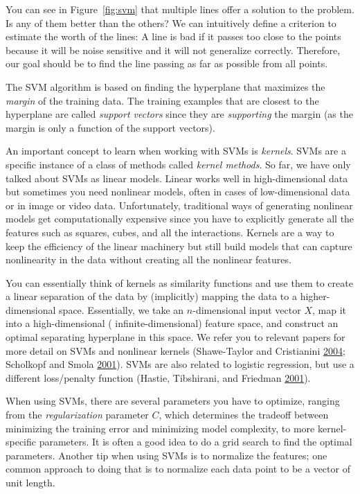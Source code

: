 \documentclass[]{krantz}
\begin{document}
You can see in Figure~\ref{fig:svm} that multiple lines offer a solution
to the problem. Is any of them better than the others? We can
intuitively define a criterion to estimate the worth of the lines: A
line is bad if it passes too close to the points because it will be
noise sensitive and it will not generalize correctly. Therefore, our
goal should be to find the line passing as far as possible from all
points.

The SVM algorithm is based on finding the hyperplane that maximizes the
\emph{margin} of the training data. The training examples that are
closest to the hyperplane are called \emph{support vectors} since they
are \emph{supporting} the margin (as the margin is only a function of
the support vectors).

An important concept to learn when working with SVMs is \emph{kernels}.
SVMs are a specific instance of a class of methods called \emph{kernel
methods}. So far, we have only talked about SVMs as linear models.
Linear works well in high-dimensional data but sometimes you need
nonlinear models, often in cases of low-dimensional data or in image or
video data. Unfortunately, traditional ways of generating nonlinear
models get computationally expensive since you have to explicitly
generate all the features such as squares, cubes, and all the
interactions. Kernels are a way to keep the efficiency of the linear
machinery but still build models that can capture nonlinearity in the
data without creating all the nonlinear features.

You can essentially think of kernels as similarity functions and use
them to create a linear separation of the data by (implicitly) mapping
the data to a higher-dimensional space. Essentially, we take an
\(n\)-dimensional input vector \(X\), map it into a high-dimensional (
infinite-dimensional) feature space, and construct an optimal separating
hyperplane in this space. We refer you to relevant papers for more
detail on SVMs and nonlinear kernels (Shawe-Taylor and Cristianini
\protect\hyperlink{ref-ShaweTaylor2004}{2004}; Scholkopf and Smola
\protect\hyperlink{ref-Scholkopf2001}{2001}). SVMs are also related to
logistic regression, but use a different loss/penalty function (Hastie,
Tibshirani, and Friedman
\protect\hyperlink{ref-HastieTibshirani}{2001}).

When using SVMs, there are several parameters you have to optimize,
ranging from the \emph{regularization} parameter \(C\), which determines
the tradeoff between minimizing the training error and minimizing model
complexity, to more kernel-specific parameters. It is often a good idea
to do a grid search to find the optimal parameters. Another tip when
using SVMs is to normalize the features; one common approach to doing
that is to normalize each data point to be a vector of unit length.
\end{document}
